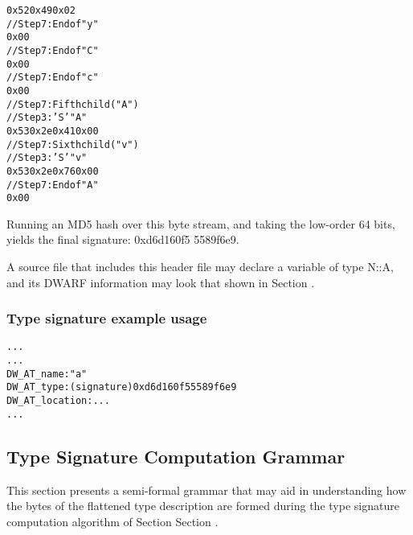 \begin{alltt}
            0x52 0x49 0x02
            // Step 7: End of  "y"
            0x00
        // Step 7: End of  "C"
        0x00
    // Step 7: End of  "c"
    0x00
// Step 7: Fifth child ("A")
    // Step 3: 'S'  "A"
    0x53 0x2e 0x41 0x00
// Step 7: Sixth child ("v")
    // Step 3: 'S'  "v"
    0x53 0x2e 0x76 0x00
// Step 7: End of  "A"
0x00
\end{alltt}

Running an MD5 hash over this byte stream, and taking the
low-order 64 bits, yields the final signature: 0xd6d160f5
5589f6e9.


A source file that includes this header file may declare a
variable of type N::A, and its DWARF information may look
that shown in 
Section .


\subsubsection{Type signature example usage}
\label{app:typesignatureexampleusage}

\begin{alltt}
  ...
    ...
      DW\-\_AT\-\_name: "a"
      DW\-\_AT\-\_type: (signature) 0xd6d160f5 5589f6e9
      DW\-\_AT\-\_location: ...
    ...
\end{alltt}

\subsection{Type Signature Computation Grammar}
\label{app:typesignaturecomputationgrammar}

This section
presents a semi-formal grammar that may aid in understanding
how the bytes of the flattened type description are formed
during the type signature computation algorithm of Section
Section . 


